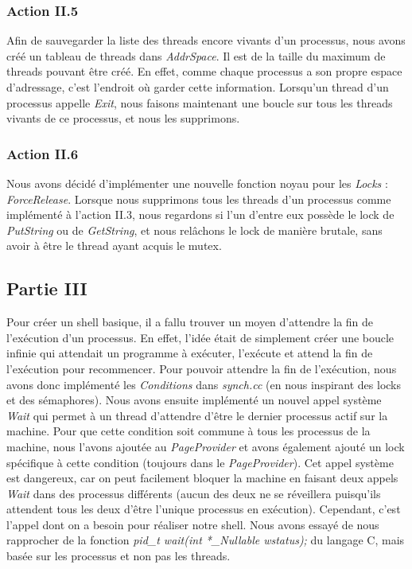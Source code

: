 \documentclass{article}
\begin{document}
\subsubsection{Action II.5}
Afin de sauvegarder la liste des threads encore vivants d'un processus, nous avons créé un tableau de threads dans \textit{AddrSpace}.
Il est de la taille du maximum de threads pouvant être créé. En effet, comme chaque processus a son propre espace d'adressage, c'est l'endroit
où garder cette information. Lorsqu'un thread d'un processus appelle \textit{Exit}, nous faisons maintenant une boucle sur tous les threads vivants
de ce processus, et nous les supprimons.

\subsubsection{Action II.6}
Nous avons décidé d'implémenter une nouvelle fonction noyau pour les \textit{Locks} : \textit{ForceRelease}. Lorsque nous supprimons tous les threads
d'un processus comme implémenté à l'action II.3, nous regardons si l'un d'entre eux possède le lock de \textit{PutString} ou  de \textit{GetString},
et nous relâchons le lock de manière brutale, sans avoir à être le thread ayant acquis le mutex.

\subsection{Partie III}
Pour créer un shell basique, il a fallu trouver un moyen d'attendre la fin de l'exécution d'un processus. En effet, l'idée était de simplement créer une
boucle infinie qui attendait un programme à exécuter, l'exécute et attend la fin de l'exécution pour recommencer. Pour pouvoir attendre la fin de l'exécution,
nous avons donc implémenté les \textit{Conditions} dans \textit{synch.cc} (en nous inspirant des locks et des sémaphores). Nous avons ensuite implémenté un nouvel
appel système \textit{Wait} qui permet à un thread d'attendre d'être le dernier processus actif sur la machine. Pour que cette condition soit commune à tous les processus
de la machine, nous l'avons ajoutée au \textit{PageProvider} et avons également ajouté un lock spécifique à cette condition (toujours dans le \textit{PageProvider}).
Cet appel système est dangereux, car on peut facilement bloquer la machine en faisant deux appels \textit{Wait} dans des processus différents 
(aucun des deux ne se réveillera puisqu'ils attendent tous les deux d'être l'unique processus en exécution). Cependant, c'est l'appel dont on a besoin pour réaliser 
notre shell. Nous avons essayé de nous rapprocher de la fonction \textit{pid\_t wait(int *\_Nullable wstatus);} du langage C, mais basée sur les processus et non pas les threads.
\end{document}
